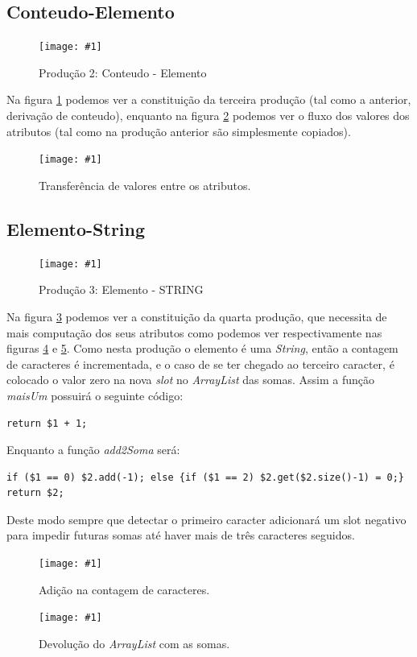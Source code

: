 \documentclass[a4paper,11pt,openright,openbib]{article}
\newcommand{\addimg}[3]{\begin{figure}[h!]
	\begin{center}
		\texttt{[image: \#1]}
	\end{center}	
	\caption{\label{#2}#3}
\end{figure}
}
\begin{document}
\subsection{Conteudo-Elemento}
\addimg{../imgs/conteudo-elemento.png}{conteudo_elemento}{Produção 2: Conteudo - Elemento}
Na figura \ref{conteudo_elemento} podemos ver a constituição da terceira produção (tal como a anterior, derivação de conteudo),
enquanto na figura \ref{fn1_conteudo_elemento} podemos ver o fluxo dos valores dos atributos (tal como na produção anterior
são simplesmente copiados).
\addimg{../imgs/fn1_conteudo-elemento.png}{fn1_conteudo_elemento}{Transferência de valores entre os atributos.}

\subsection{Elemento-String}
\addimg{../imgs/elemento-STRING.png}{elemento_string}{Produção 3: Elemento - STRING}
Na figura \ref{elemento_string} podemos ver a constituição da quarta produção, que necessita de mais computação dos
seus atributos como podemos ver respectivamente nas figuras \ref{fn1_elemento_STRING} e \ref{fn2_elemento_STRING}. Como
nesta produção o elemento é uma \emph{String}, então a contagem de caracteres é incrementada, e o caso de se ter chegado
ao terceiro caracter, é colocado o valor zero na nova \emph{slot} no \emph{ArrayList} das somas.
Assim a função \emph{maisUm} possuirá o seguinte código:
\begin{verbatim}return $1 + 1;\end{verbatim} %
Enquanto a função \emph{add2Soma} será:
\begin{verbatim}if ($1 == 0) $2.add(-1); else {if ($1 == 2) $2.get($2.size()-1) = 0;} return $2;\end{verbatim} %
Deste modo sempre que detectar o primeiro caracter adicionará um slot negativo para impedir futuras somas até haver
mais de três caracteres seguidos.
\addimg{../imgs/fn1_elemento-STRING.png}{fn1_elemento_STRING}{Adição na contagem de caracteres.}
\addimg{../imgs/fn2_elemento-STRING.png}{fn2_elemento_STRING}{Devolução do \emph{ArrayList} com as somas.}
\end{document}
